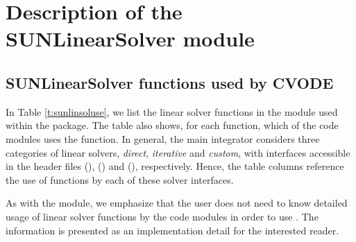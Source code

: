 \chapter{Description of the SUNLinearSolver module}\label{s:sunlinsol}



\section{SUNLinearSolver functions used by CVODE}

In Table \ref{t:sunlinsoluse}, we list the linear solver
functions in the {\sunlinsol} module used within the {\cvode} package.
The table also shows, for each function, which of the code modules uses
the function.  In general, the main {\cvode} integrator considers
three categories of linear solvers, \emph{direct}, \emph{iterative}
and \emph{custom}, with interfaces accessible in the {\cvode} header
files  ({\cvdls}), 
({\cvspils}) and  ({\cvcls}), respectively.
Hence, the table columns reference the use of {\sunlinsol}
functions by each of these solver interfaces.

As with the {\sunmatrix} module, we emphasize that the {\cvode} user
does not need to know detailed usage of linear solver functions by the
{\cvode} code modules in order to use {\cvode}. The information is
presented as an implementation detail for the interested reader.

